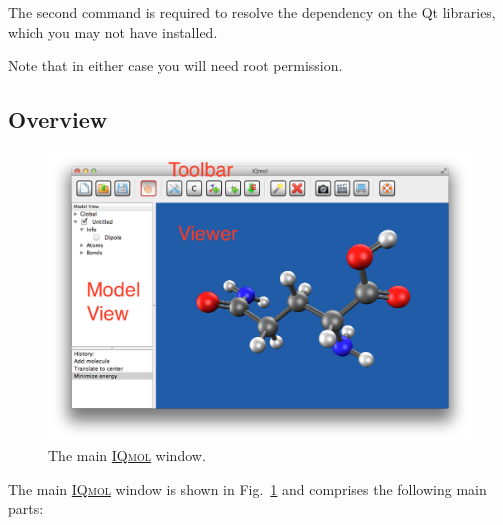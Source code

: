 \documentclass[a4paper,12pt]{article}
\newcommand{\iqmol}{\href{https://www.iqmol.org}{{\scshape IQmol}}}
\begin{document}
The second command is required to resolve the dependency on the Qt libraries,
which you may not have installed.

\hspace*{2em}{\tt \#>  sudo yum install iqmol-x.x.x.x86\_64.rpm}

Note that in either case you will need root permission.


\subsection{Overview}
\label{sec:overview}

\begin{figure}[ht]
\begin{center}
\includegraphics[scale=0.35]{figures/Viewer.png}
\caption{The main \iqmol{} window.}
\label{fig:main}
\end{center}
\end{figure}
The main \iqmol{} window is shown in Fig.~\ref{fig:main} and comprises the
following main parts:
\end{document}
